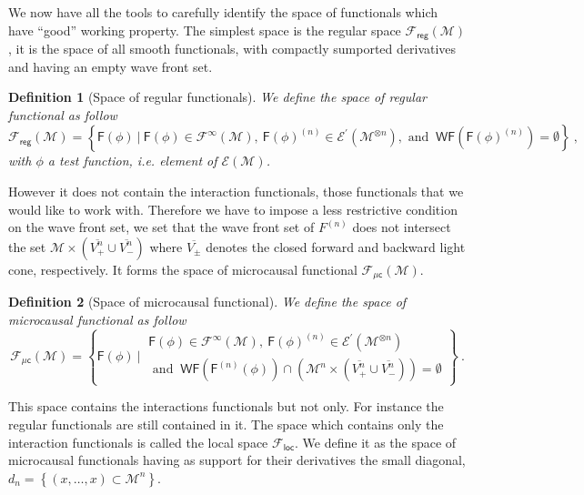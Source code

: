 \documentclass[11pt]{book}
\newcommand{\WF}{\mathsf{WF}}
\newcommand{\Ecal}{\mathcal{E}}
\newcommand{\Fcal}{\mathcal{F}}
\newcommand{\Mcal}{\mathcal{M}}
\newcommand{\Fsf}{\mathsf{F}}
\newcommand{\csf}{\mathsf{c}}
\theoremstyle{break}
\newtheorem{definition}{Definition}
\begin{document}
\bigskip


We now have all the tools to carefully identify the space of functionals which have ``good'' working property. %
The simplest space is the regular space $\mathcal{F}_\mathsf{reg}(\Mcal)$, it is the space of all smooth functionals, with compactly sumported derivatives and having an empty wave front set. %
%
\begin{definition}[Space of regular functionals]
We define the space of regular functional as follow
%
\begin{equation*}
\Fcal_{\mathsf{reg}}(\Mcal) = \left\{ \Fsf(\phi) \ \bigg| \ \Fsf(\phi) \in \Fcal^\infty(\Mcal), \ \Fsf(\phi)^{(n)} \in \Ecal^\prime(\Mcal^{\otimes n}), \mbox{ and } \ \WF(\Fsf(\phi)^{(n)}) = \emptyset \right\} \ ,
\end{equation*}
%
with $\phi$ a test function, i.e. element of $\Ecal(\Mcal)$. 
\end{definition}
%
However it does not contain the interaction functionals, those functionals that we would like to work with. Therefore we have to impose a less restrictive condition on the wave front set, we set that the wave front set of $F^{(n)}$ does not intersect the set $\mathcal{M} \times (\overline{V^n_+} \cup \overline{V^n_-})$ where $\overline{V_\pm}$ denotes the closed forward and backward light cone, respectively. It forms the space of microcausal functional $\mathcal{F}_\mathsf{\mu c}(\Mcal)$.%
%
\begin{definition}[Space of microcausal functional]
We define the space of microcausal functional as follow
%
\begin{equation*}
\Fcal_{\mu\csf}(\Mcal) = \left\{ 
\Fsf(\phi) \ \bigg| \ 
\begin{array}{l}
\Fsf(\phi) \in \Fcal^\infty(\Mcal), \ \Fsf(\phi)^{(n)} \in \Ecal^\prime(\Mcal^{\otimes n}) \\
\mbox{ and } \ \WF(\Fsf^{(n)}(\phi)) \cap \left( \Mcal^n \times ( \overline{V^{n}_{+}} \cup \overline{V^{n}_{-}} ) \right)  = \emptyset 
\end{array}
\right\} \ .
\end{equation*}
%
\end{definition}
%
This space contains the interactions functionals but not only. For instance the regular functionals are still contained in it. The space which contains only the interaction functionals is called the local space $\mathcal{F}_\mathsf{loc}$. We define it as the space of microcausal functionals having as support for their derivatives the small diagonal, $d_n = \left\{ (x,\dots,x) \subset \Mcal^n \right\}$.%
\end{document}
